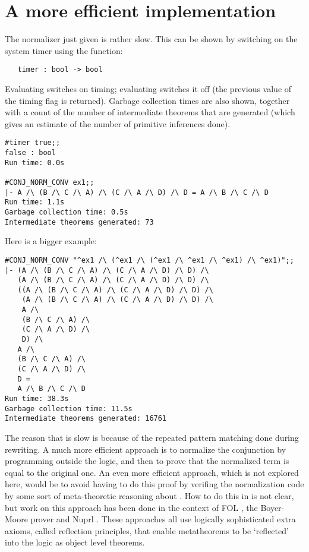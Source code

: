 \section{A more efficient implementation}

The normalizer just given is rather slow. This can be shown by switching on the
system timer using the function:

\begin{hol}\begin{verbatim}
   timer : bool -> bool
\end{verbatim}\end{hol}

\noindent Evaluating  switches on timing; evaluating
 switches it off (the previous value of the timing flag
is returned). Garbage collection times are also shown, together with a
count of the number of intermediate theorems that are generated (which
gives an estimate of the number of primitive inferences done).

\begin{session}\begin{verbatim}
#timer true;;
false : bool
Run time: 0.0s

#CONJ_NORM_CONV ex1;;
|- A /\ (B /\ C /\ A) /\ (C /\ A /\ D) /\ D = A /\ B /\ C /\ D
Run time: 1.1s
Garbage collection time: 0.5s
Intermediate theorems generated: 73
\end{verbatim}\end{session}

\noindent Here is a bigger example:

\begin{session}\begin{verbatim}
#CONJ_NORM_CONV "^ex1 /\ (^ex1 /\ (^ex1 /\ ^ex1 /\ ^ex1) /\ ^ex1)";;
|- (A /\ (B /\ C /\ A) /\ (C /\ A /\ D) /\ D) /\
   (A /\ (B /\ C /\ A) /\ (C /\ A /\ D) /\ D) /\
   ((A /\ (B /\ C /\ A) /\ (C /\ A /\ D) /\ D) /\
    (A /\ (B /\ C /\ A) /\ (C /\ A /\ D) /\ D) /\
    A /\
    (B /\ C /\ A) /\
    (C /\ A /\ D) /\
    D) /\
   A /\
   (B /\ C /\ A) /\
   (C /\ A /\ D) /\
   D =
   A /\ B /\ C /\ D
Run time: 38.3s
Garbage collection time: 11.5s
Intermediate theorems generated: 16761
\end{verbatim}\end{session}

The reason that  is slow is because of the
repeated pattern matching done during rewriting. A much more efficient
approach is to normalize the conjunction by \ML{} programming outside
the logic, and then to prove that the normalized term is equal to the
original one. An even more efficient approach, which is not explored
here, would be to avoid having to do this proof by verifing the
normalization code by some sort of meta-theoretic
reasoning about \ML. How to do this in
\HOL{} is not clear, but work on this approach has been done in the
context of {\small FOL} \cite{FOL}, the Boyer-Moore prover \cite{BoyerMoore}
and Nuprl \cite{Nuprl}. These approaches all use logically
sophisticated extra axioms, called reflection principles, that enable
metatheorems to be `reflected' into the logic as object level
theorems.

